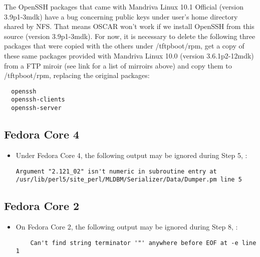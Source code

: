 \begin{itemize}
The OpenSSH packages that came with Mandriva Linux 10.1 Official (version 
3.9p1-3mdk) have a bug concerning public keys under user's home directory 
shared by NFS. That means OSCAR won't work if we install OpenSSH from this 
source (version 3.9p1-3mdk). For now, it is necessary to delete the following 
three packages that were copied with the others under /tftpboot/rpm, get a copy 
of these same packages provided with Mandriva Linux 10.0 (version 3.6.1p2-12mdk) 
from a FTP miroir (see link for a list of mirroirs above) and copy them to 
/tftpboot/rpm, replacing the original packages:
\begin{verbatim}
  openssh
  openssh-clients
  openssh-server
\end{verbatim}

\end{itemize}

\subsection{Fedora Core 4}
\label{subsec:fc4notes}

\begin{itemize}
\item Under Fedora Core 4, the following output may be ignored during 
Step 5, :
\begin{verbatim}
Argument "2.121_02" isn't numeric in subroutine entry at 
/usr/lib/perl5/site_perl/MLDBM/Serializer/Data/Dumper.pm line 5
\end{verbatim}
\end{itemize}


\subsection{Fedora Core 2}
\label{subsec:fc2notes}

\begin{itemize}
\item On Fedora Core 2, the following output may be ignored during Step 8,
  :
  \begin{verbatim}
    Can't find string terminator '"' anywhere before EOF at -e line 1
  \end{verbatim}
\end{itemize}

